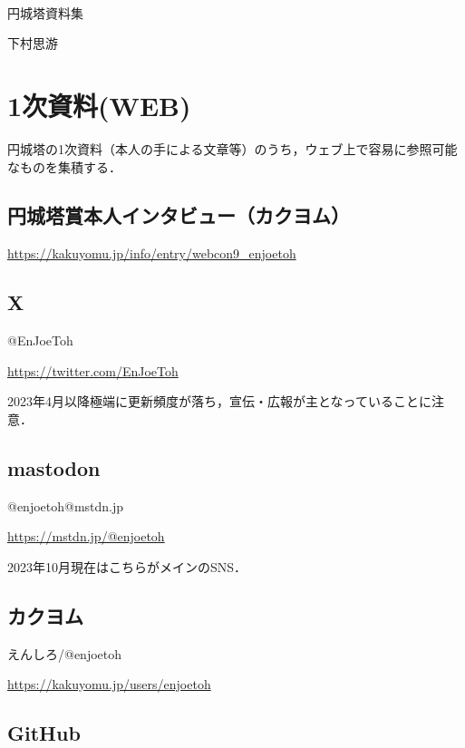 \documentclass[10pt, a5paper, twoside]{jsarticle}
\theoremstyle{definition}
\begin{document}
	~ %

	\begin{center}

		\Large{円城塔資料集}

		\vspace{3mm}
		
		\large{下村思游}

	\end{center}

	\vspace{3mm}

	\section{1次資料(WEB)}

		円城塔の1次資料（本人の手による文章等）のうち，ウェブ上で容易に参照可能なものを集積する．

		\subsection{円城塔賞本人インタビュー（カクヨム）}

			\url{https://kakuyomu.jp/info/entry/webcon9_enjoetoh}

		\subsection{X}

			@EnJoeToh

			\url{https://twitter.com/EnJoeToh}

			2023年4月以降極端に更新頻度が落ち，宣伝・広報が主となっていることに注意．

		\subsection{mastodon}

			@enjoetoh@mstdn.jp
	
			\url{https://mstdn.jp/@enjoetoh}

			2023年10月現在はこちらがメインのSNS．

		\subsection{カクヨム}

			えんしろ/@enjoetoh

			\url{https://kakuyomu.jp/users/enjoetoh}

		\subsection{GitHub}
\end{document}

